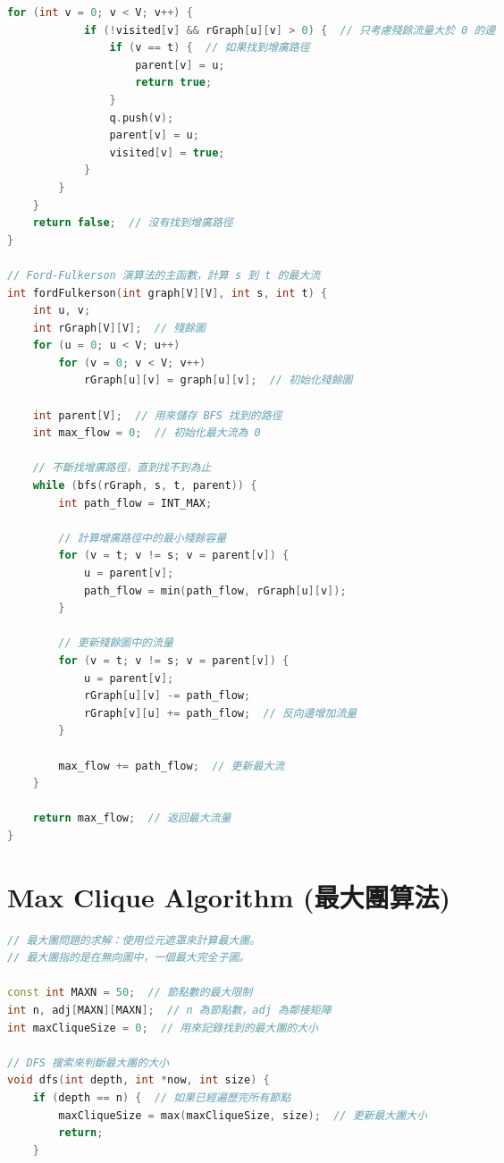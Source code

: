 \documentclass{article}
\begin{document}
\begin{multicols}{2}
\begin{lstlisting}[language=C++]
        for (int v = 0; v < V; v++) {
            if (!visited[v] && rGraph[u][v] > 0) {  // 只考慮殘餘流量大於 0 的邊
                if (v == t) {  // 如果找到增廣路徑
                    parent[v] = u;
                    return true;
                }
                q.push(v);
                parent[v] = u;
                visited[v] = true;
            }
        }
    }
    return false;  // 沒有找到增廣路徑
}

// Ford-Fulkerson 演算法的主函數，計算 s 到 t 的最大流
int fordFulkerson(int graph[V][V], int s, int t) {
    int u, v;
    int rGraph[V][V];  // 殘餘圖
    for (u = 0; u < V; u++)
        for (v = 0; v < V; v++)
            rGraph[u][v] = graph[u][v];  // 初始化殘餘圖

    int parent[V];  // 用來儲存 BFS 找到的路徑
    int max_flow = 0;  // 初始化最大流為 0

    // 不斷找增廣路徑，直到找不到為止
    while (bfs(rGraph, s, t, parent)) {
        int path_flow = INT_MAX;

        // 計算增廣路徑中的最小殘餘容量
        for (v = t; v != s; v = parent[v]) {
            u = parent[v];
            path_flow = min(path_flow, rGraph[u][v]);
        }

        // 更新殘餘圖中的流量
        for (v = t; v != s; v = parent[v]) {
            u = parent[v];
            rGraph[u][v] -= path_flow;
            rGraph[v][u] += path_flow;  // 反向邊增加流量
        }

        max_flow += path_flow;  // 更新最大流
    }

    return max_flow;  // 返回最大流量
}
\end{lstlisting}

\section{Max Clique Algorithm (最大團算法)}

\begin{lstlisting}[language=C++]
// 最大團問題的求解：使用位元遮罩來計算最大團。
// 最大團指的是在無向圖中，一個最大完全子圖。

const int MAXN = 50;  // 節點數的最大限制
int n, adj[MAXN][MAXN];  // n 為節點數，adj 為鄰接矩陣
int maxCliqueSize = 0;  // 用來記錄找到的最大團的大小

// DFS 搜索來判斷最大團的大小
void dfs(int depth, int *now, int size) {
    if (depth == n) {  // 如果已經遍歷完所有節點
        maxCliqueSize = max(maxCliqueSize, size);  // 更新最大團大小
        return;
    }


\end{lstlisting}
\end{multicols}
\end{document}
